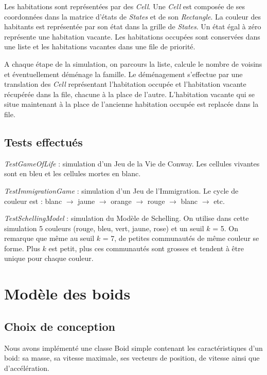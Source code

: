 \documentclass[a4paper, 11pt]{article}
\begin{document}
Les habitations sont représentées par des \textit{Cell}. Une \textit{Cell} est composée de ses coordonnées dans la matrice d'états de \textit{States} et de son \textit{Rectangle}. La couleur des habitants est représentée par son état dans la grille de \textit{States}. Un état égal à zéro représente une habitation vacante. Les habitations occupées sont conservées dans une liste et les habitations vacantes dans une file de priorité.

A chaque étape de la simulation, on parcours la liste, calcule le nombre de voisins et éventuellement déménage la famille. Le déménagement s'effectue par une translation des \textit{Cell} représentant l'habitation occupée et l'habitation vacante récupérée dans la file, chacune à la place de l'autre. L'habitation vacante qui se situe maintenant à la place de l'ancienne habitation occupée est replacée dans la file.


\subsection*{Tests effectués}

\textit{TestGameOfLife} : simulation d'un Jeu de la Vie de Conway. Les cellules vivantes sont en bleu et les cellules mortes en blanc.

\textit{TestImmigrationGame} : simulation d'un Jeu de l'Immigration. Le cycle de couleur est : blanc $\rightarrow$ jaune $\rightarrow$ orange $\rightarrow$ rouge $\rightarrow$ blanc $\rightarrow$ etc.

\textit{TestSchellingModel} : simulation du Modèle de Schelling. On utilise dans cette simulation 5 couleurs (rouge, bleu, vert, jaune, rose) et un seuil $k$ = 5. On remarque que même au seuil $k$ = 7, de petites communautés de même couleur se forme. Plus $k$ est petit, plus ces communautés sont grosses et tendent à être unique pour chaque couleur.

\section{Modèle des boids}

\subsection*{Choix de conception}
Nous avons implémenté une classe Boid simple contenant les caractéristiques d'un boid: sa masse, sa vitesse maximale, ses vecteurs de position, de vitesse ainsi que d'accélération.
\end{document}
